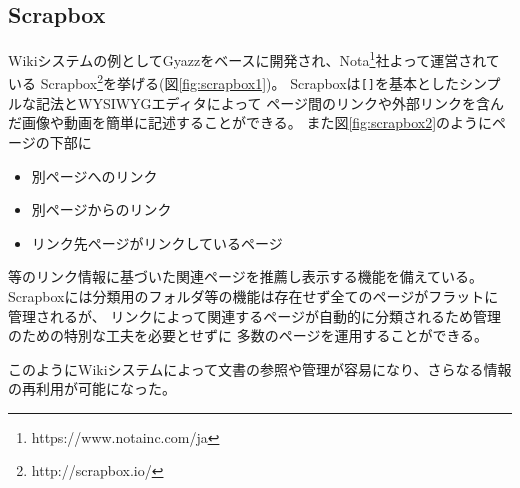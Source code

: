 \subsection{Scrapbox}
Wikiシステムの例としてGyazz\cite{Gyazz}をベースに開発され、Nota\footnote{\textsf{https://www.notainc.com/ja}}社よって運営されている
Scrapbox\footnote{http://scrapbox.io/}を挙げる(図\ref{fig:scrapbox1})。
Scrapboxは\texttt{[]}を基本としたシンプルな記法とWYSIWYGエディタによって
ページ間のリンクや外部リンクを含んだ画像や動画を簡単に記述することができる。
また図\ref{fig:scrapbox2}のようにページの下部に
\begin{itemize}
    \item 別ページへのリンク
    \item 別ページからのリンク
    \item リンク先ページがリンクしているページ
\end{itemize}等のリンク情報に基づいた関連ページを推薦し表示する機能を備えている。
Scrapboxには分類用のフォルダ等の機能は存在せず全てのページがフラットに管理されるが、
リンクによって関連するページが自動的に分類されるため管理のための特別な工夫を必要とせずに
多数のページを運用することができる。

このようにWikiシステムによって文書の参照や管理が容易になり、さらなる情報の再利用が可能になった。

